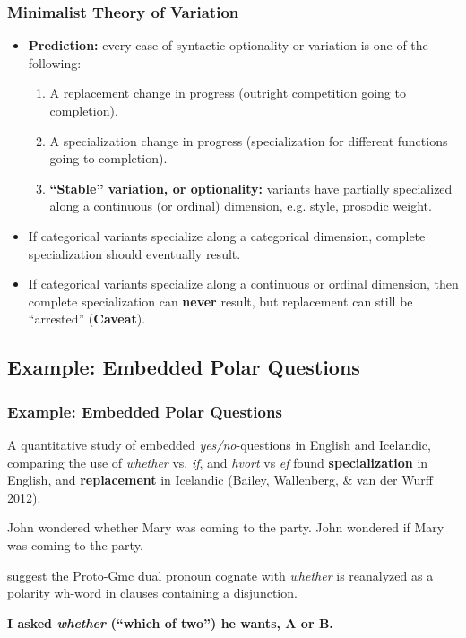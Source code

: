 \documentclass[hyperref={pdfpagelabels=false}]{beamer}
\begin{document}
\begin{frame}
\frametitle{Minimalist Theory of Variation}
\begin{itemize}
	\item \textbf{Prediction:} every case of syntactic optionality or variation is one of the following:
		\begin{enumerate}
			\item A replacement change in progress (outright competition going to completion).
			\item A specialization change in progress (specialization for different functions going to completion).
			\item \textbf{``Stable'' variation, or optionality:} variants have partially specialized along a continuous (or ordinal) dimension, e.g. style, prosodic weight. 
		\end{enumerate}
	\item If categorical variants specialize along a categorical dimension, complete specialization should eventually result.
	\item If categorical variants specialize along a continuous or ordinal dimension, then complete specialization can \textbf{never} result, but replacement can still be ``arrested'' (\textbf{Caveat}).
\end{itemize}

\end{frame}

\subsection{Example: Embedded Polar Questions}

\begin{frame}
\frametitle{Example: Embedded Polar Questions}
A quantitative study of embedded \textsl{yes/no}-questions in English and Icelandic, comparing the use of \textsl{whether} vs. \textsl{if}, and \textsl{hvort} vs \textsl{ef} found \textbf{specialization} in English, and \textbf{replacement} in Icelandic (Bailey, Wallenberg, \& van der Wurff 2012). \nocite{baileywallenbergwurff2012}\\
	\begin{exe}
		\ex John wondered whether Mary was coming to the party.
		\ex John wondered if Mary was coming to the party.
	\end{exe}
\citet{baileywallenbergwurff2012} suggest the Proto-Gmc dual pronoun cognate with \textsl{whether} is reanalyzed as a polarity wh-word in clauses containing a disjunction.
\begin{center}
 \textbf{I asked \textsl{whether} (``which of two'') he wants, A or B.}%
\end{center}
\end{frame}
\end{document}
